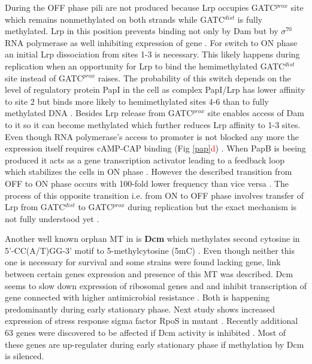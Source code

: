 During the OFF phase  pili are not produced because Lrp occupies GATC$^{prox}$ site which remains nonmethylated on both strands while GATC$^{dist}$ is fully methylated.
Lrp in this position prevents binding not only by Dam but by $\sigma^{70}$ RNA polymerase as well inhibiting expression of  gene \cite{weyand2000regulation}.
For switch to ON phase an initial Lrp dissociation from sites 1-3 is necessary.
This likely happens during replication when an opportunity for Lrp to bind the hemimethylated GATC$^{dist}$ site instead of GATC$^{prox}$ raises.
The probability of this switch depends on the level of regulatory protein PapI in the cell as complex PapI/Lrp has lower affinity to site 2 but binds more likely to hemimethylated sites 4-6 than to fully methylated DNA \cite{hernday2003mechanism}.
Besides Lrp release from GATC$^{prox}$ site enables access of Dam to it so it can become methylated which further reduces Lrp affinity to 1-3 sites.
Even though RNA polymerase's access to  promoter is not blocked any more the expression itself requires cAMP-CAP binding (Fig \ref{pap}\textcolor{red}{d}) \cite{weyand2001essential}.
When PapB is beeing produced it acts as a  gene transcription activator leading to a feedback loop which stabilizes the cells in ON phase \cite{forsman1989autoregulation}.
However the described transition from OFF to ON phase occurs with 100-fold lower frequency than vice versa \cite{blyn1990regulation}.
The process of this opposite transition i.e. from ON to OFF phase involves transfer of Lrp from GATC$^{dist}$ to GATC$^{prox}$ during replication but the exact mechanism is not fully understood yet \cite{adhikari2016dna}.

Another well known orphan MT in  is \textbf{Dcm} which methylates second cytosine in 5'-CC(A/T)GG-3' motif to 5-methylcytosine (5mC) \cite{marinus1973isolation}.
Even though neither this one is necessary for  survival and some strains were found lacking  gene, link between certain genes expression and presence of this MT was described.
Dcm seems to slow down expression of ribosomal genes  and  and inhibit transcription of  gene connected with higher antimicrobial resistance \cite{militello2012conservation, militello2014cytosine}.
Both is happening predominantly during early stationary phase.
Next study shows increased expression of stress response sigma factor RpoS in  mutant \cite{kahramanoglou2012genomics}.
Recently additional 63 genes were discovered to be affected if Dcm activity is inhibited \cite{militello20165}.
Most of these genes are up-regulater during early stationary phase if methylation by Dcm is silenced.

